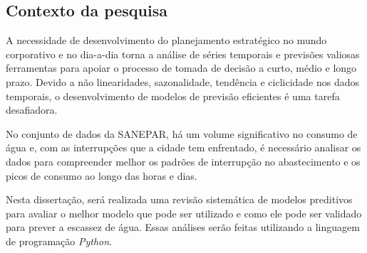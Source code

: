 \subsection{Contexto da pesquisa} \label{subsec:contexto}
 A necessidade de desenvolvimento do planejamento estratégico no mundo corporativo e no dia-a-dia torna a análise de séries temporais e previsões valiosas ferramentas para apoiar o processo de tomada de decisão a curto, médio e longo prazo. Devido a não linearidades, sazonalidade, tendência e ciclicidade nos dados temporais, o desenvolvimento de modelos de previsão eficientes é uma tarefa desafiadora. 

%
%

No conjunto de dados da SANEPAR, há um volume significativo no consumo de água e, com as interrupções que a cidade tem enfrentado, é necessário analisar os dados para compreender melhor os padrões de interrupção no abastecimento e os picos de consumo ao longo das horas e dias.

Nesta dissertação, será realizada uma revisão sistemática de modelos preditivos para avaliar o melhor modelo que pode ser utilizado e como ele pode ser validado para prever a escassez de água. Essas análises serão feitas utilizando a linguagem de programação \textit{Python}.


